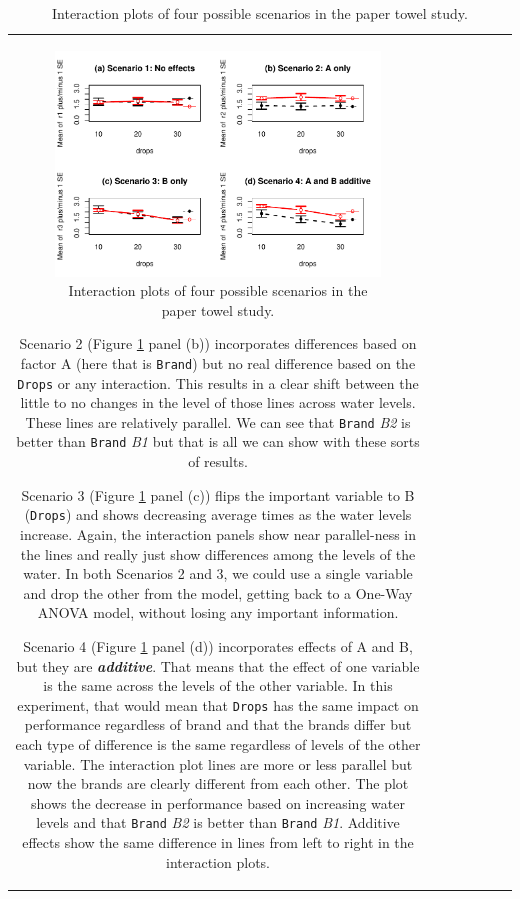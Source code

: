 \documentclass[]{book}
\theoremstyle{definition}
\theoremstyle{definition}
\theoremstyle{remark}
\begin{document}
\begin{longtable}[]{@{}ccccccc@{}}
\begin{minipage}[b]{0.10\columnwidth}
\begin{figure}
\centering
\includegraphics{04-twoWayAnova_files/figure-latex/Figure4-4-1.pdf}
\caption{\label{fig:Figure4-4}Interaction plots of four possible scenarios in the paper
towel study.}
\end{figure}

Scenario 2 (Figure \ref{fig:Figure4-4} panel (b)) incorporates
differences based on factor A (here that is \texttt{Brand}) but no real
difference based on the \texttt{Drops} or any interaction. This results
in a clear shift between the little to no changes in the level of those
lines across water levels. These lines are relatively parallel. We can
see that \texttt{Brand} \emph{B2} is better than \texttt{Brand}
\emph{B1} but that is all we can show with these sorts of results.

Scenario 3 (Figure \ref{fig:Figure4-4} panel (c)) flips the important
variable to B (\texttt{Drops}) and shows decreasing average times as the
water levels increase. Again, the interaction panels show near
parallel-ness in the lines and really just show differences among the
levels of the water. In both Scenarios 2 and 3, we could use a single
variable and drop the other from the model, getting back to a One-Way
ANOVA model, without losing any important information.

Scenario 4 (Figure \ref{fig:Figure4-4} panel (d)) incorporates effects
of A and B, but they are \textbf{\emph{additive}}. That means that the
effect of one variable is the same across the levels of the other
variable. In this experiment, that would mean that \texttt{Drops} has
the same impact on performance regardless of brand and that the brands
differ but each type of difference is the same regardless of levels of
the other variable. The interaction plot lines are more or less parallel
but now the brands are clearly different from each other. The plot shows
the decrease in performance based on increasing water levels and that
\texttt{Brand} \emph{B2} is better than \texttt{Brand} \emph{B1}.
Additive effects show the same difference in lines from left to right in
the interaction plots.


\end{minipage}
\end{longtable}
\end{document}
